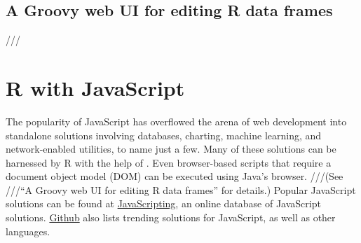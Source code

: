 \subsection{A Groovy web UI for editing R data frames}

///




%
%
%
%
%

\section{R with JavaScript}

The popularity of JavaScript has overflowed the arena of web development into standalone solutions involving databases, charting, machine learning, and network-enabled utilities, to name just a few. Many of these solutions can be harnessed by R with the help of . Even browser-based scripts that require a document object model (DOM) can be executed using Java's  browser. ///(See ///“A Groovy web UI for editing R data frames” for  details.) Popular JavaScript solutions can be found at \href{https://www.javascripting.com/}{JavaScripting}, an online database of JavaScript solutions. \href{https://github.com/trending/javascript?since=monthly}{Github} also lists trending solutions for JavaScript, as well as other languages.

